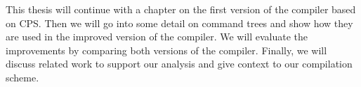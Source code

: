 This thesis will continue with a chapter on the first version of the compiler based on CPS. Then we will go into some detail on command trees and show how they are used in the improved version of the compiler. We will evaluate the improvements by comparing both versions of the compiler. Finally, we will discuss related work to support our analysis and give context to our compilation scheme.